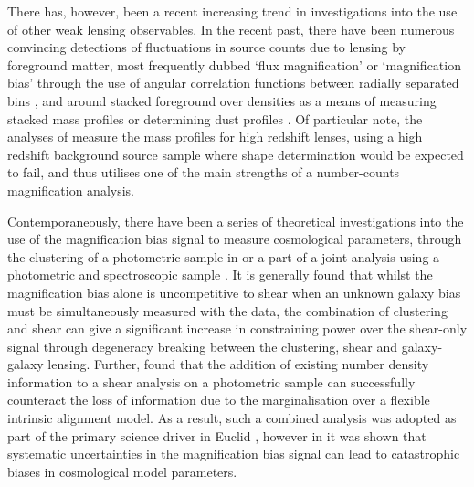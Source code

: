 \documentclass[useAMS,usenatbib,times,letter,amssymb]{mn2e}
\begin{document}
There has, however, been a recent increasing trend in investigations into the use of other weak lensing observables. In the recent past, there have been numerous convincing detections of fluctuations in source counts due to lensing by foreground matter, most frequently dubbed `flux magnification' or `magnification bias' through the use of angular correlation functions between radially separated bins \citep{Myers:2003p2024,Scranton:2005p1124,Hildebrandt:2009p845,Morrison:2012p1286}, and around stacked foreground over densities as a means of measuring stacked mass profiles \citep{Ford:2014p2751,Ford:2014p2825,Bauer:2011p2066,Umetsu:2014p2726,Hildebrandt:2011p2755} or determining dust profiles \citep{Menard:2010p1495,Hildebrandt:2013p2756}. Of particular note, the analyses of \citep{Hildebrandt:2011p2755,Hildebrandt:2013p2756} measure the mass profiles for high redshift lenses, using a high redshift background source sample where shape determination would be expected to fail, and thus utilises one of the main strengths of a number-counts magnification analysis.   

Contemporaneously, there have been a series of theoretical investigations into the use of the magnification bias signal to measure cosmological parameters, through the clustering of a photometric sample in \cite{Duncan:2014p2569,Joachimi:2010p855,Waerbeke:2010p7,2010MNRAS.401.2093V} or a part of a joint analysis using a photometric and spectroscopic sample \citep{Gaztanaga:2012p1194,Eriksen:2015p2849}. It is generally found that whilst the magnification bias alone is uncompetitive to shear when an unknown galaxy bias must be simultaneously measured with the data, the combination of clustering and shear can give a significant increase in constraining power over the shear-only signal through degeneracy breaking between the clustering, shear and galaxy-galaxy lensing. Further, \cite{Joachimi:2010p855} found that the addition of existing number density information to a shear analysis on a photometric sample can successfully counteract the loss of information due to the marginalisation over a flexible intrinsic alignment model. As a result, such a combined analysis was adopted as part of the primary science driver in Euclid \citep{Laureijs:2011p2021}, however in \cite{Duncan:2014p2569} it was shown that systematic uncertainties in the magnification bias signal can lead to catastrophic biases in cosmological model parameters.
\end{document}
